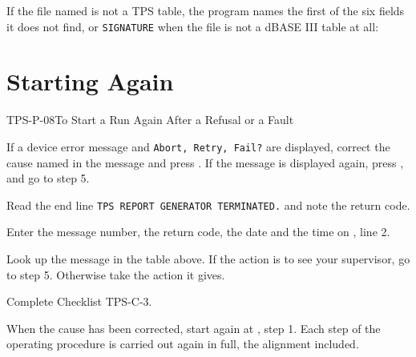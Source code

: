 If the file named is not a TPS table, the program names the first of the six
fields it does not find, or \texttt{SIGNATURE} when the file is not a dBASE
III table at all:


\section{Starting Again}
\begin{Procedure}{TPS-P-08}{To Start a Run Again After a Refusal or a Fault}
\begin{ProcSteps}
\item If a device error message and \texttt{Abort, Retry, Fail?} are
  displayed, correct the cause named in the message and press .  If
  the message is displayed again, press , and go to step 5.
\item Read the end line \texttt{TPS REPORT GENERATOR TERMINATED.} and note the
  return code.
\item Enter the message number, the return code, the date and the time on
  , line 2.
\item Look up the message in the table above.  If the action is to see your
  supervisor, go to step 5.  Otherwise take the action it gives.
\item Complete Checklist TPS-C-3.
\item When the cause has been corrected, start again at , step 1.
  Each step of the operating procedure is carried out again in full, the
  alignment included.
\end{ProcSteps}
\end{Procedure}

